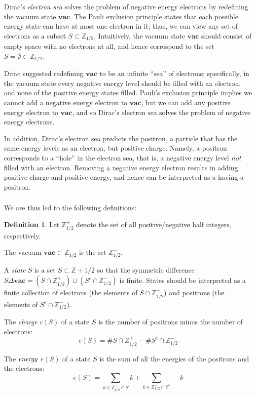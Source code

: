 \documentclass{amsart}[12pt]
\theoremstyle{definition}
\newtheorem{definition}[dummy]{Definition}
\newcommand{\Z}{\mathbb{Z}}
\newcommand{\vac}{\mathbf{vac}}
\begin{document}
Dirac's \emph{electron sea} solves the problem of negative energy electrons by redefining the vacuum state $\vac$.  The Pauli exclusion principle states that each possible energy state can have at most one electron in it; thus, we can view any set of electrons as a subset $S\subset \Z_{1/2}$.  Intuitively, the vacuum state $\vac$ should consist of empty space with no electrons at all, and hence correspond to the set $S=\emptyset\subset\Z_{1/2}$.

Dirac suggested redefining $\vac$ to be an
infinite ``sea'' of electrons; specifically, in the vacuum state every negative energy level should be filled with an electron, and none of the positive energy states filled.   Pauli's
exclusion principle implies we cannot add a negative energy electron
to $\vac$, but we can add any positive energy electron to $\vac$, and so Dirac's electron sea solves the problem of negative energy electrons.

In addition, Dirac's electron sea predicts the positron, a particle
that has the same energy levels as an electron, but positive charge.  Namely, a positron corresponds to a ``hole'' in the electron sea, that is, a negative
energy level \emph{not} filled with an electron.  Removing a negative energy electron results in adding positive charge and positive energy, and hence can be interpreted as a having a positron.

\subsubsection{} We are thus led to the following definitions:

\begin{definition} Let $\Z_{1/2}^\pm$ denote the set of all positive/negative half integers, respectively.

The vacuum $\vac\subset \Z_{1/2}$ is the set $\Z_{1/2}^-$.

A \emph{state} $S$ is a set $S\subset\Z+1/2$ so that the symmetric
difference $S\Delta \vac=(S\cap\Z_{1/2}^+)\cup (S^c\cap\Z_{1/2}^-)$ is finite.  States should be interpreted as a finite collection of electrons (the elements of $S\cap \Z^+_{1/2}$) and positrons (the elements of $S^c\cap \Z^-_{1/2}$).

The \emph{charge} $c(S)$ of a state $S$ is the number of positrons minus the number of electrons:
$$c(S)=\# S\cap Z^+_{1/2} - \# S^c\cap \Z^-_{1/2}$$

The $\emph{energy}$ $e(S)$ of a state $S$ is the sum of all the energies of the positrons and the electrons:
$$e(S)=\sum_{k\in\Z^+_{1/2}\cap S} k +\sum_{k\in\Z^-_{1/2}\cap S^c} -k$$

\end{definition}
\end{document}
